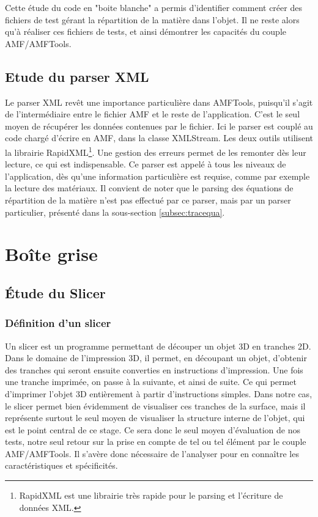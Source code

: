 \documentclass{tnreport}
\begin{document}
Cette étude du code en "boite blanche" a permis d'identifier comment créer des fichiers de test gérant la répartition de la matière dans l'objet. Il ne reste alors qu'à réaliser ces fichiers de tests, et ainsi démontrer les capacités du couple AMF/AMFTools.

\subsection{Etude du parser XML}

Le parser XML revêt une importance particulière dans AMFTools, puisqu'il s'agit de l'intermédiaire entre le fichier AMF et le reste de l'application. C'est le seul moyen de récupérer les données contenues par le fichier. Ici le parser est couplé au code chargé d'écrire en AMF, dans la classe XMLStream. Les deux outils utilisent la librairie RapidXML\footnote{RapidXML est une librairie très rapide pour le parsing et l'écriture de données XML.}. Une gestion des erreurs permet de les remonter dès leur lecture, ce qui est indispensable. Ce parser est appelé à tous les niveaux de l'application, dès qu'une information particulière est requise, comme par exemple la lecture des matériaux. Il convient de noter que le parsing des équations de répartition de la matière n'est pas effectué par ce parser, mais par un parser particulier, présenté dans la sous-section \ref{subsec:tracequa}.
\section{Boîte grise}
\subsection{Étude du Slicer}\label{subsec:etuslicer}
\subsubsection{Définition d'un slicer}
Un slicer est un programme permettant de découper un objet 3D en tranches 2D. Dans le domaine de l'impression 3D, il permet, en découpant un objet, d'obtenir des tranches qui seront ensuite converties en instructions d'impression. Une fois une tranche imprimée, on passe à la suivante, et ainsi de suite. Ce qui permet d'imprimer l'objet 3D entièrement à partir d'instructions simples. Dans notre cas, le slicer permet bien évidemment de visualiser ces tranches de la surface, mais il représente surtout le seul moyen de visualiser la structure interne de l'objet, qui est le point central de ce stage. Ce sera donc le seul moyen d'évaluation de nos tests, notre seul retour sur la prise en compte de tel ou tel élément par le couple AMF/AMFTools. Il s'avère donc nécessaire de l'analyser pour en connaître les caractéristiques et spécificités.  
\end{document}
